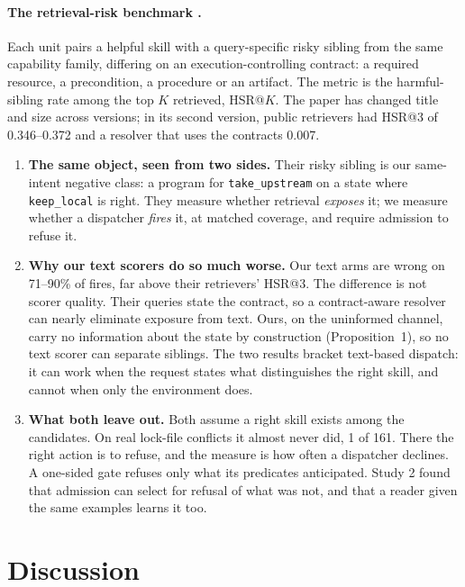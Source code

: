 \documentclass[11pt]{article}
\newcommand{\code}[1]{\texttt{#1}}
\begin{document}
\paragraph{The retrieval-risk benchmark \cite{ding2026rightfamily}.}
Each unit pairs a helpful skill with a query-specific risky sibling from the same capability
family, differing on an execution-controlling contract: a required resource, a precondition, a
procedure or an artifact. The metric is the harmful-sibling rate among the top $K$ retrieved,
HSR@$K$. The paper has changed title and size across versions; in its second version, public
retrievers had HSR@3 of 0.346--0.372 and a resolver that uses the contracts 0.007.

\begin{enumerate}
  \item \textbf{The same object, seen from two sides.} Their risky sibling is our same-intent
  negative class: a program for \code{take\_upstream} on a state where \code{keep\_local} is
  right. They measure whether retrieval \emph{exposes} it; we measure whether a dispatcher
  \emph{fires} it, at matched coverage, and require admission to refuse it.
  \item \textbf{Why our text scorers do so much worse.} Our text arms are wrong on 71--90\% of
  fires, far above their retrievers' HSR@3. The difference is not scorer quality. Their queries
  state the contract, so a contract-aware resolver can nearly eliminate exposure from text.
  Ours, on the uninformed channel, carry no information about the state by construction
  (Proposition~1), so no text scorer can separate siblings. The two results bracket text-based
  dispatch: it can work when the request states what distinguishes the right skill, and cannot
  when only the environment does.
  \item \textbf{What both leave out.} Both assume a right skill exists among the candidates. On
  real lock-file conflicts it almost never did, 1 of 161. There the right action is to refuse,
  and the measure is how often a dispatcher declines. A one-sided gate refuses only what its
  predicates anticipated. Study 2 found that admission can select for refusal of what was not,
  and that a reader given the same examples learns it too.
\end{enumerate}

\section{Discussion}
\label{sec:discussion}
\end{document}
